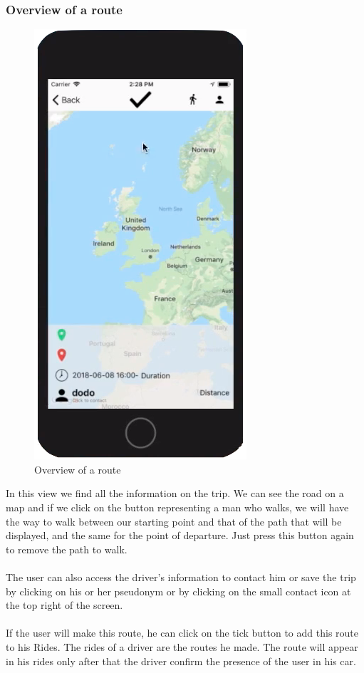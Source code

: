 \subsubsection{Overview of a route}

\begin{figure}[h!]
\begin{center}
\includegraphics[scale = 0.3]{diagrams/OverviewRoute.png} 
\end{center}
\caption{Overview of a route}
\end{figure}

In this view we find all the information on the trip. We can see the road on a map and if we click on the button representing a man who walks, we will have the way to walk between our starting point and that of the path that will be displayed, and the same for the point of departure. Just press this button again to remove the path to walk.
\\\\
The user can also access the driver's information to contact him or save the trip by clicking on his or her pseudonym or by clicking on the small contact icon at the top right of the screen.
\\\\
If the user will make this route, he can click on the tick button to add this route to his Rides. The rides of a driver are the routes he made. The route will appear in his rides only after that the driver confirm the presence of the user in his car.

